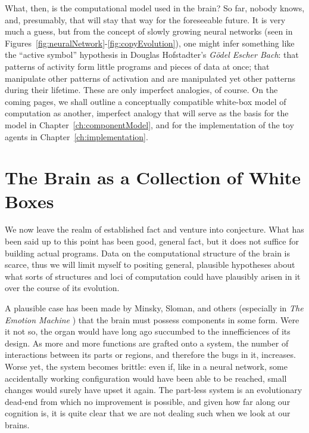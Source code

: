 What, then, is the computational model used in the brain? So far, nobody knows, and, presumably, that will stay that way for the foreseeable future. It is very much a guess, but from the concept of slowly growing neural networks (seen in Figures~\ref{fig:neuralNetwork}-\ref{fig:copyEvolution}), one might infer something like the ``active symbol'' hypothesis in Douglas Hofstadter's {\em G\"{o}del Escher Bach}: that patterns of activity form little programs and pieces of data at once; that manipulate other patterns of activation and are manipulated yet other patterns during their lifetime. These are only imperfect analogies, of course. On the coming pages, we shall outline a conceptually compatible white-box model of computation as another, imperfect analogy that will serve as the basis for the model in Chapter~\ref{ch:componentModel}, and for the implementation of the toy agents in Chapter~\ref{ch:implementation}.

\section{The Brain as a Collection of White Boxes}\label{sec:whiteBoxModel1}

We now leave the realm of established fact and venture into conjecture. What has been said up to this point has been good, general fact, but it does not suffice for building actual programs. Data on the computational structure of the brain is scarce, thus we will limit myself to positing general, plausible hypotheses about what sorts of structures and loci of computation could have plausibly arisen in it over the course of its evolution. 

A plausible case has been made by Minsky, Sloman, and others (especially in {\em The Emotion Machine} \cite{emotionMachine}) that the brain must possess components in some form. Were it not so, the organ would have long ago succumbed to the innefficiences of its design. As more and more functions are grafted onto a system, the number of interactions between its parts or regions, and therefore the bugs in it, increases. Worse yet, the system becomes brittle: even if, like in a neural network, some accidentally working configuration would have been able to be reached, small changes would surely have upset it again. The part-less system is an evolutionary dead-end from which no improvement is possible, and given how far along our cognition is, it is quite clear that we are not dealing such when we look at our brains.


